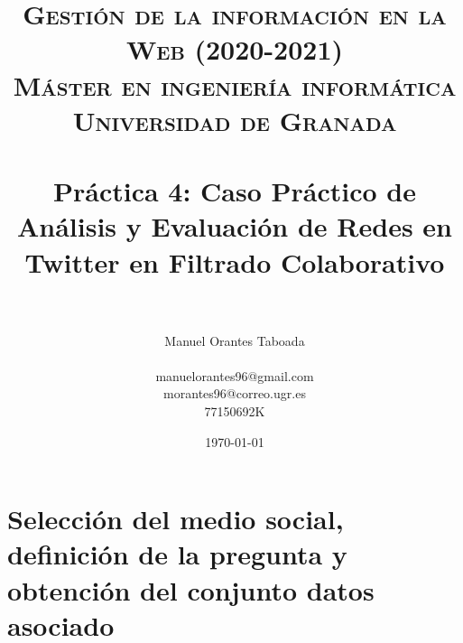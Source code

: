 
\usepackage{booktabs}
\usepackage{tabularx}
\usepackage{multicol} 
\usepackage{hyperref}


\title{
	\normalfont \normalsize 
	\textsc{\textbf{Gestión de la información en la Web (2020-2021)} \\ Máster en
		ingeniería informática \\ Universidad de Granada} \\ [25pt] %
	\horrule{0.5pt} \\[0.4cm] %
	\huge Práctica 4: Caso Práctico de Análisis y Evaluación de Redes en Twitter en
	Filtrado Colaborativo \\ %
	\horrule{2pt} \\[0.5cm] %
}
\author{Manuel Orantes Taboada \\ \\ manuelorantes96@gmail.com \\
	morantes96@correo.ugr.es \\ 77150692K} %

\date{\normalsize\today} %



	
	\maketitle %
	
	\newpage %
	
	\tableofcontents %
	
	\newpage
	
\section{Selección del medio social, definición de la pregunta y obtención del conjunto datos asociado}

